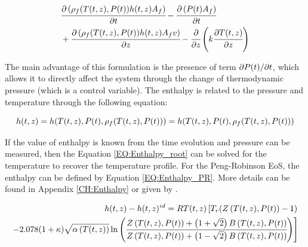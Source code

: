 \documentclass[../Article_Model_Parameters.tex]{subfiles}
\begin{document}
			{\footnotesize
				\begin{align} \label{EQ:Enthalpy_equation}
					&\cfrac{\partial \left({\color{black}\rho_f}({\color{black}T}(t,z),{\color{black}P}(t)) {\color{black}h}(t,z) A_f\right)}{\partial t} - \cfrac{\partial \left({\color{black}P}(t) A_f\right)}{\partial t} \nonumber \\
					&+ \cfrac{\partial \left( {\color{black}\rho_f}({\color{black}T}(t,z),{\color{black}P}(t)) {\color{black}h}(t,z) A_f v \right)}{\partial {\color{black}z}} - \cfrac{\partial}{\partial {\color{black}z}} \left( k \cfrac{\partial {\color{black}T}(t,z)}{\partial {\color{black}z}} \right)
				\end{align}
			}
		
			The main advantage of this formulation is the presence of term $\partial {\color{black}P}(t) / \partial t $, which allows it to directly affect the system through the change of thermodynamic pressure (which is a control variable). The enthalpy is related to the pressure and temperature through the following equation:
			
			{\footnotesize
				\begin{equation}
					{\color{black}h}(t,z)={\color{black}h}({\color{black}T}(t,z),{\color{black}P}(t),{\color{black}\rho_f}({\color{black}T}(t,z),{\color{black}P}(t)))={\color{black}h}( {\color{black}T}(t,z),{\color{black}P}(t), {\color{black}\rho_f}({\color{black}T}(t,z),{\color{black}P}(t)) ) 
					\label{EQ:Enthalpy_root}
				\end{equation}
			}
		
			If the value of enthalpy is known from the time evolution and pressure can be measured, then the Equation \ref{EQ:Enthalpy_root} can be solved for the temperature to recover the temperature profile. For the Peng-Robinson EoS, the enthalpy can be defined by Equation \ref{EQ:Enthalpy_PR}. More details can be found in Appendix \ref{CH:Enthalpy} or given by \citet{Gmehling2019}.
			
			{\scriptsize
				\begin{equation}
					\begin{split}
					{\color{black}h}(t,z)-{\color{black}h}(t,z)^{id}={\color{black}R}{\color{black}T}(t,z) \left[{\color{black}T_r}({\color{black}Z}\left({\color{black}T}(t,z), {\color{black}P}(t)\right)-1) \right. \\
					\left. -2.078(1+{\color{black}\kappa} ){\sqrt { {\color{black}\alpha}\left({\color{black}T}(t,z)\right) } } \ln \left(\cfrac{{\color{black}Z}\left({\color{black}T}(t,z), {\color{black}P}(t)\right)+\left( 1+\sqrt{2} \right){\color{black}B}\left({\color{black}T}(t,z), {\color{black}P}(t)\right)}{{\color{black}Z}\left({\color{black}T}(t,z), {\color{black}P}(t)\right)+\left( 1-\sqrt{2} \right){\color{black}B}\left({\color{black}T}(t,z), {\color{black}P}(t)\right)}\right)\right]
					\label{EQ:Enthalpy_PR}
				\end{split}
			\end{equation}				
			}
		
\end{document}

